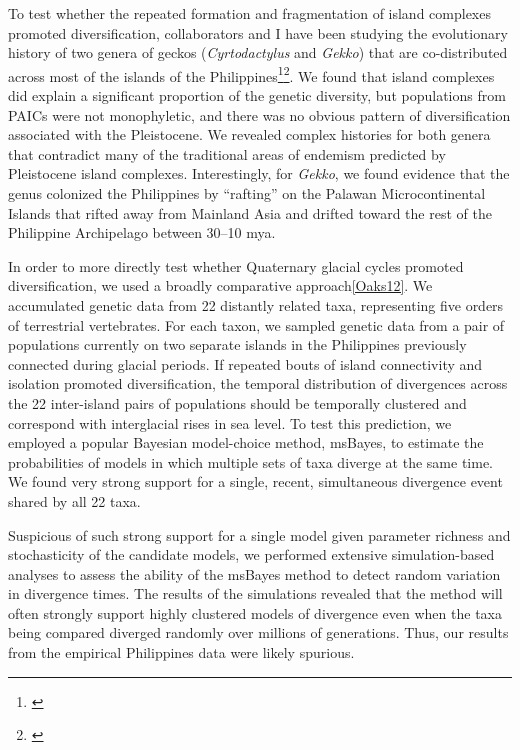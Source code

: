 To test whether the repeated formation and fragmentation of island complexes
promoted diversification, collaborators and I have been studying the
evolutionary history of two genera of geckos (\emph{Cyrtodactylus} and
\emph{Gekko}) that are co-distributed across most of the islands of the
Philippines\footnote{\label{Siler10}}\super{,}\footnote{\label{Siler12}}.
We found that island complexes did explain a significant proportion of the
genetic diversity, but populations from PAICs were not monophyletic, and there
was no obvious pattern of diversification associated with the Pleistocene.
We revealed complex histories for both genera that contradict many of the
traditional areas of endemism predicted by Pleistocene island complexes.
Interestingly, for \emph{Gekko}, we found evidence that the genus colonized the
Philippines by ``rafting'' on the Palawan Microcontinental Islands that rifted
away from Mainland Asia and drifted toward the rest of the Philippine
Archipelago between 30--10 mya.

In order to more directly test whether Quaternary glacial cycles promoted
diversification, we used a broadly comparative approach\cref{Oaks12}.
We accumulated genetic data from 22 distantly related taxa, representing five
orders of terrestrial vertebrates.
For each taxon, we sampled genetic data from a pair of populations currently on
two separate islands in the Philippines previously connected during glacial
periods.
If repeated bouts of island connectivity and isolation promoted
diversification, the temporal distribution of divergences across the 22
inter-island pairs of populations should be temporally clustered and correspond
with interglacial rises in sea level.
To test this prediction, we employed a popular Bayesian model-choice method,
msBayes, to estimate the probabilities of models in which multiple sets of taxa
diverge at the same time.
We found very strong support
for a single, recent, simultaneous divergence event shared by all 22 taxa.

Suspicious of such strong support for a single model given parameter richness
and stochasticity of the candidate models,
we performed extensive simulation-based analyses to assess the ability of the
msBayes method to detect random variation in divergence times.
The results of the simulations revealed that the method will often strongly
support highly clustered models of divergence even when the taxa being compared
diverged randomly over millions of generations.
Thus, our results from the empirical Philippines data were likely spurious.

